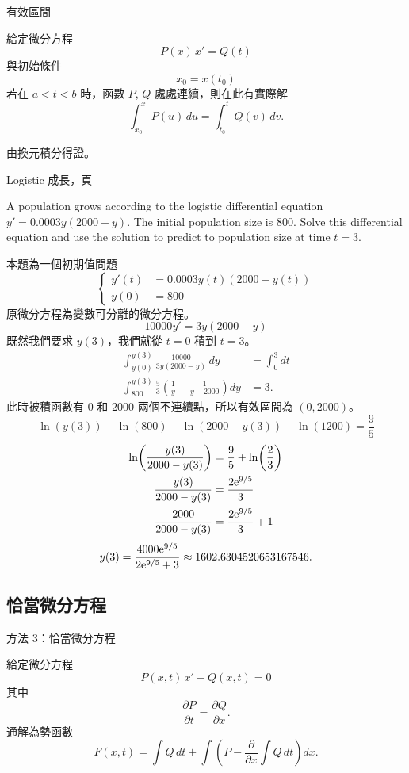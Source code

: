 \documentclass{beamer}
\newcommand{\Left} {\mathopen{}\mathclose\bgroup\left}
\newcommand{\Right}{\aftergroup\egroup\right}
\newcommand  {\e}{\textup e}
\theoremstyle{remark}
\begin{document}
\begin{CJK}{UTF8}{bsmi}
\begin{frame}{有效區間}
  \begin{theorem}
    給定微分方程
    \[ P(x)\,x' = Q(t) \]
    與初始條件
    \[ x_0 = x(t_0) \]
    若在 $a < t < b$ 時，函數 $P$, $Q$ 處處連續，則在此有實際解
    \[ \int_{x_0}^x P(u)\,du = \int_{t_0}^t Q(v)\,dv.\]
  \end{theorem}

  由換元積分得證。
\end{frame}

\begin{frame}[allowframebreaks]{Logistic 成長，頁}
  \begin{example}
    A population grows according to the logistic differential equation $y' = 0.0003y \left( 2000-y \right)$. The initial
    population size is 800. Solve this differential equation and use the solution to predict to population size at time
    $t=3$.
  \end{example}
  本題為一個初期值問題
  \[\left\{ \begin{aligned}
      y'(t) &= 0.0003y(t) \left( 2000-y(t) \right)\\
      y(0)  &= 800
    \end{aligned} \right.\]
  原微分方程為變數可分離的微分方程。
  \[10000y' = 3y \left( 2000 - y \right)\]
  既然我們要求 $y(3)$，我們就從 $t=0$ 積到 $t=3$。
  \begin{align*}
    \int_{y(0)}^{y(3)} \frac{10000}{3y \left( 2000 - y \right)}\,dy &= \int_0^3 dt\\
    \int_{800}^{y(3)} \frac53 \left( \frac1y - \frac{1}{y-2000} \right) dy &= 3.
  \end{align*}
  此時被積函數有 0 和 2000 兩個不連續點，所以有效區間為 $(0, 2000)$。
  \[\ln(y(3)) - \ln(800) - \ln(2000 - y(3)) + \ln(1200) = \frac95\]
  \begin{align*}
    \ln \Left( \frac{y(3)}{2000-y(3)} \Right) &= \frac95 + \ln \Left( \frac23 \Right)\\
    \frac{y(3)}{2000-y(3)} &= \frac{2\e^{9/5}}{3}\\
    \frac{2000}{2000-y(3)} &= \frac{2\e^{9/5}}{3} + 1
  \end{align*}
  \[y(3) = \frac{4000\e^{9/5}}{2\e^{9/5}+3} \approx 1602.6304520653167546.\]
\end{frame}

\subsection[恰當--積分乘數]{恰當微分方程}
\begin{frame}{方法 3：恰當微分方程}
  \begin{theorem}
    給定微分方程
    \[P(x,t)\,x' + Q(x,t) = 0\]
    其中
    \begin{equation*}
      \frac{\partial P}{\partial t} = \frac{\partial Q}{\partial x}.
    \end{equation*}
    通解為勢函數
    \[F(x,t) = \int Q\,dt + \int \left( P - \frac{\partial}{\partial x} \int Q\,dt \right) dx.\]
  \end{theorem}
\end{frame}


\end{CJK}
\end{document}
